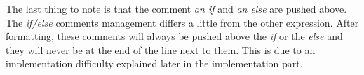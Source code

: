 The last thing to note is that the comment \emph{an if} and \emph{an else} are pushed above. The \emph{if/else} comments management differs a little from the other expression. After formatting, these comments will always be pushed above the \textit{if} or the \emph{else} and they will never be at the end of the line next to them. This is due to an implementation difficulty explained later in the implementation part.




